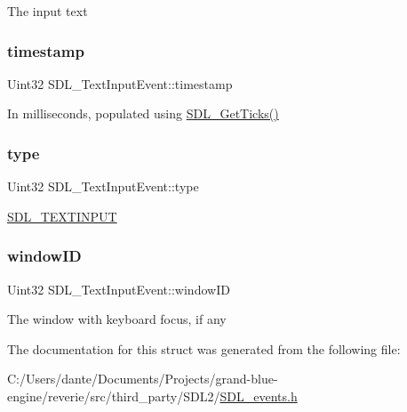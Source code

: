 The input text \mbox{\label{struct_s_d_l___text_input_event_a20b190a96494918690ea7f99187be948}} 
\subsubsection{\texorpdfstring{timestamp}{timestamp}}
{\footnotesize\ttfamily Uint32 S\+D\+L\+\_\+\+Text\+Input\+Event\+::timestamp}

In milliseconds, populated using \mbox{\hyperlink{_s_d_l__timer_8h_a0b9bc71d6287e0ffafdc3419760fe2b3}{S\+D\+L\+\_\+\+Get\+Ticks()}} \mbox{\label{struct_s_d_l___text_input_event_a90576be2ea52e694deff40d0586654f5}} 
\subsubsection{\texorpdfstring{type}{type}}
{\footnotesize\ttfamily Uint32 S\+D\+L\+\_\+\+Text\+Input\+Event\+::type}

\mbox{\hyperlink{_s_d_l__events_8h_a3b589e89be6b35c02e0dd34a55f3fccaa4fa2570088f6b9cbd109ae91b511368f}{S\+D\+L\+\_\+\+T\+E\+X\+T\+I\+N\+P\+UT}} \mbox{\label{struct_s_d_l___text_input_event_aeb4f7a939353990ca40261ffbfbeb3d0}} 
\subsubsection{\texorpdfstring{windowID}{windowID}}
{\footnotesize\ttfamily Uint32 S\+D\+L\+\_\+\+Text\+Input\+Event\+::window\+ID}

The window with keyboard focus, if any 

The documentation for this struct was generated from the following file\+:\begin{DoxyCompactItemize}
\item 
C\+:/\+Users/dante/\+Documents/\+Projects/grand-\/blue-\/engine/reverie/src/third\+\_\+party/\+S\+D\+L2/\mbox{\hyperlink{_s_d_l__events_8h}{S\+D\+L\+\_\+events.\+h}}\end{DoxyCompactItemize}
